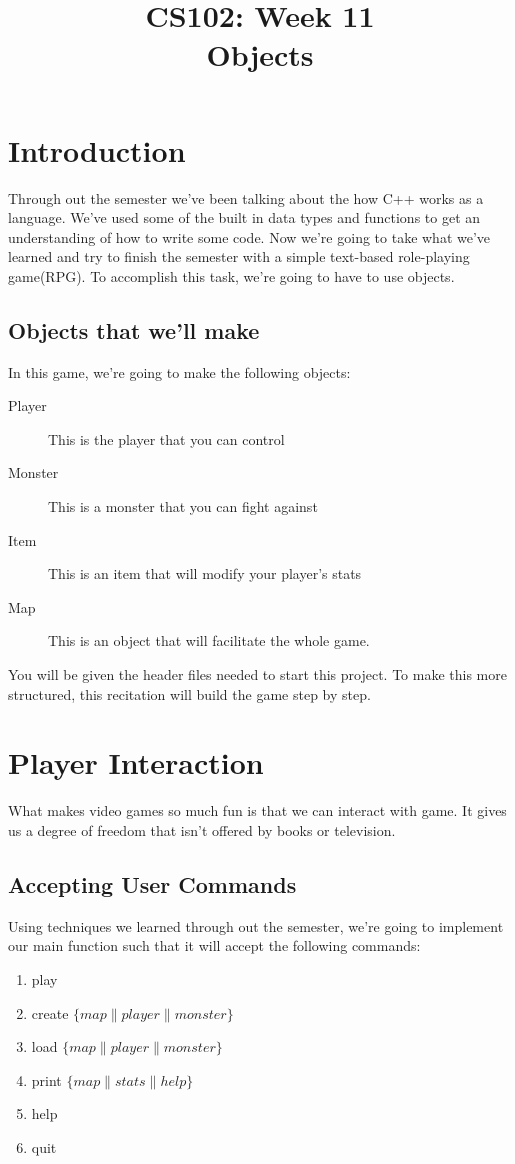 \documentclass{article}
\begin{document}
\title{CS102: Week 11\\Objects}

\maketitle
\section*{Introduction}
Through out the semester we've been talking about the how C++ works as a language. We've used some of the built in data types and functions to get an understanding of how to write some code. Now we're going to take what we've learned and try to finish the semester with a simple text-based role-playing game(RPG). To accomplish this task, we're going to have to use objects. 

\subsection*{Objects that we'll make}
In this game, we're going to make the following objects:
\begin{description}
\item[Player] This is the player that you can control 
\item[Monster] This is a monster that you can fight against
\item[Item] This is an item that will modify your player's stats
\item[Map] This is an object that will facilitate the whole game. 
\end{description}

You will be given the header files needed to start this project. To make this more structured, this recitation will build the game step by step.

\section{Player Interaction}
What makes video games so much fun is that we can interact with game. It gives us a degree of freedom that isn't offered by books or television. 
\subsection{Accepting User Commands}
Using techniques we learned through out the semester, we're going to implement our main function such that it will accept the following commands:
\begin{enumerate}
\item play
\item create $\{map\|player\|monster\}$
\item load $\{map\|player\|monster\}$
\item print $\{map\|stats\|help\}$
\item help
\item quit
\end{enumerate}
\pagebreak
\end{document}
